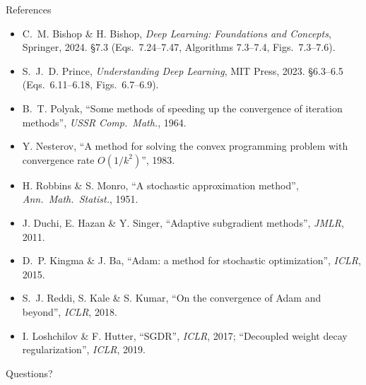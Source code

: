 \documentclass[aspectratio=169, 11pt]{beamer}
\newcommand{\nosrc}{}       %
\begin{document}
\begin{frame}{References}
  \nosrc
  \vspace{0.2em}
  {\scriptsize
  \begin{itemize}\itemsep0.26em
    \item C.~M. Bishop \& H. Bishop, \emph{Deep Learning: Foundations
          and Concepts}, Springer, 2024. \S7.3 (Eqs.~7.24--7.47,
          Algorithms 7.3--7.4, Figs.~7.3--7.6).
    \item S.~J.~D. Prince, \emph{Understanding Deep Learning}, MIT
          Press, 2023. \S6.3--6.5 (Eqs.~6.11--6.18, Figs.~6.7--6.9).
    \item B.~T. Polyak, ``Some methods of speeding up the convergence of
          iteration methods'', \emph{USSR Comp.~Math.}, 1964.
    \item Y. Nesterov, ``A method for solving the convex programming
          problem with convergence rate $O(1/k^2)$'', 1983.
    \item H. Robbins \& S. Monro, ``A stochastic approximation method'',
          \emph{Ann.~Math.~Statist.}, 1951.
    \item J. Duchi, E. Hazan \& Y. Singer, ``Adaptive subgradient
          methods'', \emph{JMLR}, 2011.
    \item D.~P. Kingma \& J. Ba, ``Adam: a method for stochastic
          optimization'', \emph{ICLR}, 2015.
    \item S.~J. Reddi, S. Kale \& S. Kumar, ``On the convergence of Adam
          and beyond'', \emph{ICLR}, 2018.
    \item I. Loshchilov \& F. Hutter, ``SGDR'', \emph{ICLR}, 2017;
          ``Decoupled weight decay regularization'', \emph{ICLR}, 2019.
  \end{itemize}}
\end{frame}

\begin{frame}[standout]
  \nosrc
  Questions?
\end{frame}
\end{document}
